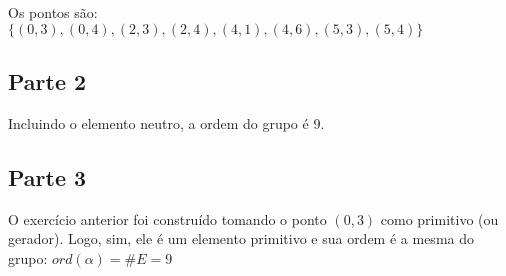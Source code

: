 \documentclass[a4paper]{article}
\begin{document}
Os pontos são: $\{(0, 3), (0, 4), (2, 3), (2, 4), (4, 1), (4, 6), (5, 3), (5, 4)\}$

\subsection{Parte 2}

Incluindo o elemento neutro, a ordem do grupo é 9.

\subsection{Parte 3}

O exercício anterior foi construído tomando o ponto $(0, 3)$ como primitivo (ou gerador). Logo, sim,
ele é um elemento primitivo e sua ordem é a mesma do grupo: $ord(\alpha) = \#E = 9$

\end{document}
